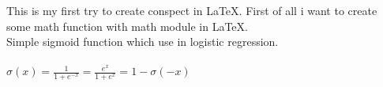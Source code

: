 


This is my first try to create conspect in \LaTeX. First of all i want
to create some math function with math module in \LaTeX.\\
Simple sigmoid function which use in logistic regression.\\\\
\centering$\sigma(x)=\frac{1}{1+e^{-x}}=\frac{e^x}{1+e^x}=1-\sigma(-x)$




